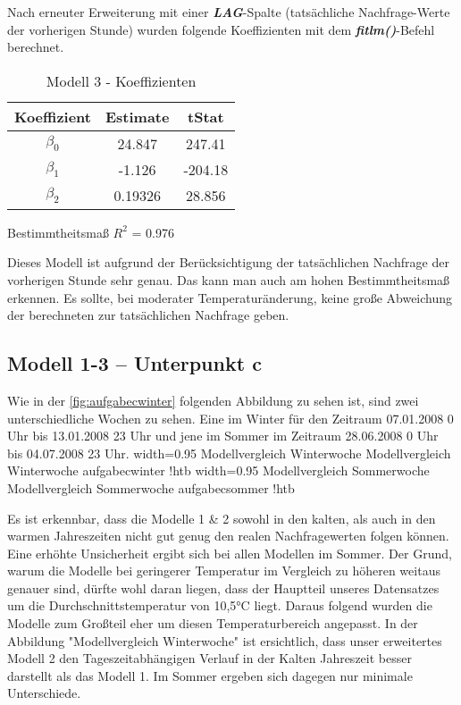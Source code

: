 \documentclass{eegreport}
\begin{document}
Nach erneuter Erweiterung mit einer\textbf{\emph{ LAG}}-Spalte (tatsächliche Nachfrage-Werte der vorherigen Stunde) wurden folgende Koeffizienten mit dem \textbf{\emph{fitlm()}}-Befehl berechnet.
\newpage
\begin{table}[!h]
\begin{center}
\begin{tabular}{|c|c|c|}
\hline 
 Koeffizient & Estimate & tStat \\ 
\hline 
$\beta_0$ & 24.847 & 247.41 \\ 
\hline 
$\beta_1$ & -1.126 & -204.18 \\ 
\hline 
$\beta_2$ & 0.19326 & 28.856 \\ 
\hline 
\end{tabular} 
\end{center}
\caption{Modell 3 - Koeffizienten}
\label{modell3koeff}
\end{table}


Bestimmtheitsmaß $R^2$ = 0.976

Dieses Modell ist aufgrund der Berücksichtigung der tatsächlichen Nachfrage der vorherigen Stunde sehr genau. Das kann man auch am hohen Bestimmtheitsmaß erkennen.
Es sollte, bei moderater Temperaturänderung, keine große Abweichung der berechneten zur tatsächlichen Nachfrage geben. 



\subsection{Modell 1-3 – Unterpunkt c}
Wie in der \ref{fig:aufgabecwinter} folgenden Abbildung zu sehen ist, sind zwei unterschiedliche Wochen zu sehen. Eine im Winter für den Zeitraum 07.01.2008 0 Uhr bis 13.01.2008 23 Uhr und jene im Sommer im Zeitraum 28.06.2008 0 Uhr bis 04.07.2008 23 Uhr.
\newpage
{}
{width=0.95\textwidth}
{Modellvergleich Winterwoche}
{Modellvergleich Winterwoche}
{aufgabecwinter}
{!htb}
\newpage
{}
{width=0.95\textwidth}
{Modellvergleich Sommerwoche}
{Modellvergleich Sommerwoche}
{aufgabecsommer}
{!htb}



Es ist erkennbar, dass die Modelle 1 \& 2 sowohl in den kalten, als auch in den warmen Jahreszeiten nicht gut genug den realen Nachfragewerten folgen können. Eine erhöhte Unsicherheit ergibt sich bei allen Modellen im Sommer. 
Der Grund, warum die Modelle bei geringerer Temperatur im Vergleich zu höheren weitaus genauer sind, dürfte wohl daran liegen, dass der Hauptteil unseres Datensatzes um die Durchschnittstemperatur von 10,5°C liegt. Daraus folgend wurden die Modelle zum Großteil eher um diesen Temperaturbereich angepasst.
In der Abbildung "Modellvergleich Winterwoche" ist ersichtlich, dass unser erweitertes Modell 2 den Tageszeitabhängigen Verlauf in der Kalten Jahreszeit besser darstellt als das Modell 1. Im Sommer ergeben sich dagegen nur minimale Unterschiede.
\end{document}
